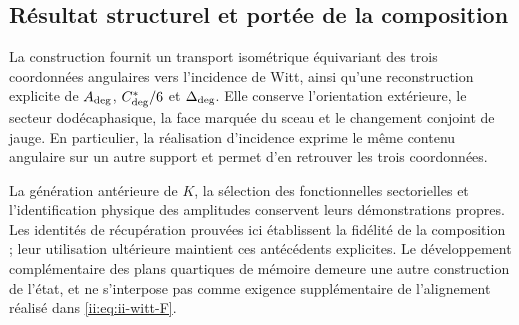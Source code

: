 \subsection{Résultat structurel et portée de la composition}

La construction fournit un transport isométrique équivariant des trois coordonnées angulaires vers l’incidence de Witt, ainsi qu’une reconstruction explicite de \(A_{\rm deg}\), \(C^*_{\rm deg}/6\) et \(\Delta_{\rm deg}\). Elle conserve l’orientation extérieure, le secteur dodécaphasique, la face marquée du sceau et le changement conjoint de jauge. En particulier, la réalisation d’incidence exprime le même contenu angulaire sur un autre support et permet d’en retrouver les trois coordonnées.

La génération antérieure de \(K\), la sélection des fonctionnelles
sectorielles et l’identification physique des amplitudes conservent leurs
démonstrations propres. Les identités de récupération prouvées ici
établissent la fidélité de la composition ; leur utilisation ultérieure maintient
ces antécédents explicites. Le développement complémentaire des plans
quartiques de mémoire demeure une autre construction de l’état, et ne
s’interpose pas comme exigence supplémentaire de l’alignement réalisé dans
\eqref{ii:eq:ii-witt-F}.
